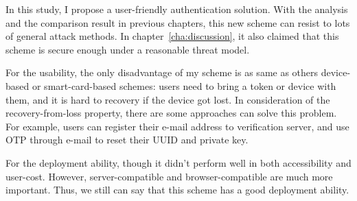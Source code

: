 \begin{CJK}{Bg5}{bsmi}
In this study, I propose a user-friendly authentication solution. With the analysis and the comparison result in previous chapters, this new scheme can resist to lots of general attack methods. In chapter~\ref{cha:discussion}, it also claimed that this scheme is secure enough under a reasonable threat model. 

For the usability, the only disadvantage of my scheme is as same as others device-based or smart-card-based schemes: users need to bring a token or device with them, and it is hard to recovery if the device got lost. In consideration of the recovery-from-loss property, there are some approaches can solve this problem. For example, users can register their e-mail address to verification server, and use OTP through e-mail to reset their UUID and private key.

For the deployment ability, though it didn't perform well in both accessibility and user-cost. However, server-compatible and browser-compatible are much more important. Thus, we still can say that this scheme has a good deployment ability.

\end{CJK}